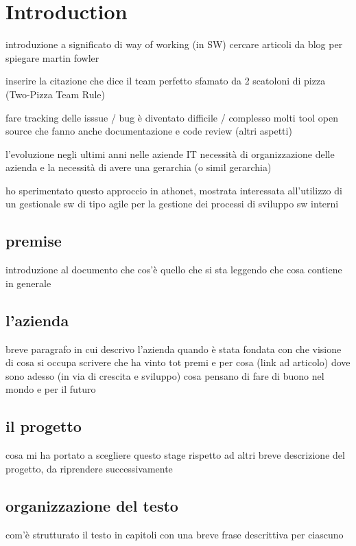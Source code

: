 \chapter{Introduction}
\label{introduction}

introduzione a significato di way of working (in SW)
	cercare articoli da blog per spiegare
	martin fowler		

inserire la citazione che dice il team perfetto sfamato da 2 scatoloni di pizza (Two-Pizza Team Rule)

fare tracking delle isssue / bug è diventato difficile / complesso
	molti tool open source che fanno anche documentazione e code review (altri aspetti)

l'evoluzione negli ultimi anni nelle aziende IT
	necessità di organizzazione delle azienda e la necessità di avere una gerarchia (o simil gerarchia)

ho sperimentato questo approccio in athonet, mostrata interessata all'utilizzo di un gestionale sw di tipo agile per la gestione dei processi di sviluppo sw interni

\section{premise}
introduzione al documento
che cos'è quello che si sta leggendo
che cosa contiene in generale

\section{l'azienda}
breve paragrafo in cui descrivo l'azienda
quando è stata fondata
con che visione
di cosa si occupa
scrivere che ha vinto tot premi e per cosa (link ad articolo)
dove sono adesso (in via di crescita e sviluppo)
cosa pensano di fare di buono nel mondo e per il futuro

\section{il progetto}
cosa mi ha portato a scegliere questo stage rispetto ad altri
breve descrizione del progetto, da riprendere successivamente

\section{organizzazione del testo}
com'è strutturato il testo in capitoli con una breve frase descrittiva per ciascuno
